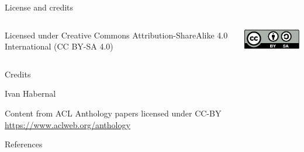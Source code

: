 \documentclass[12pt]{beamer}
\begin{document}
\begin{frame}{License and credits}
	
	\begin{columns}
		\begin{column}{0.7\textwidth}
			Licensed under Creative Commons Attribution-ShareAlike 4.0 International (CC BY-SA 4.0)
		\end{column}
		\begin{column}{0.2\textwidth}
			\includegraphics[width=0.9\linewidth]{img/cc-by-sa-icon.pdf}
		\end{column}
	\end{columns}
	
	\bigskip
	
	Credits
	
	\begin{scriptsize}
		
		Ivan Habernal
		
		Content from ACL Anthology papers licensed under CC-BY \url{https://www.aclweb.org/anthology}
		
	
	\end{scriptsize}
	
\end{frame}

\begin{frame}[allowframebreaks]{References}
	\printbibliography
\end{frame}
\end{document}
